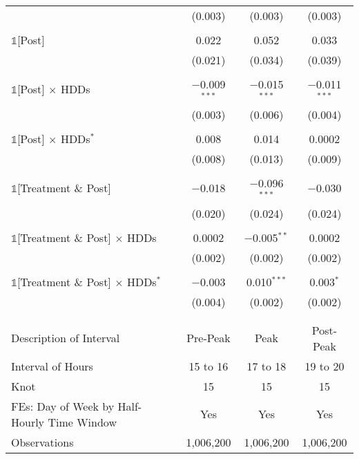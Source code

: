 {\begin{table}[t!]
\begin{adjustbox}{scale = 0.75}
\begin{threeparttable}
\begin{tabular}{@{\extracolsep{100pt}}lccc}
                    & (0.003) & (0.003) & (0.003) \\
                    & & & \\
                    $\mathbb{1}$[Post] & 0.022 & 0.052 & 0.033 \\
                    & (0.021) & (0.034) & (0.039) \\
                    & & & \\
                    $\mathbb{1}$[Post] $\times$ HDDs & $-$0.009$^{***}$ & $-$0.015$^{***}$ & $-$0.011$^{***}$ \\
                    & (0.003) & (0.006) & (0.004) \\
                    & & & \\
                    $\mathbb{1}$[Post] $\times$ HDDs$^{*}$ & 0.008 & 0.014 & 0.0002 \\
                    & (0.008) & (0.013) & (0.009) \\
                    & & & \\
                    $\mathbb{1}$[Treatment \& Post] & $-$0.018 & $-$0.096$^{***}$ & $-$0.030 \\
                    & (0.020) & (0.024) & (0.024) \\
                    & & & \\
                    $\mathbb{1}$[Treatment \& Post] $\times$ HDDs & 0.0002 & $-$0.005$^{**}$ & 0.0002 \\
                    & (0.002) & (0.002) & (0.002) \\
                    & & & \\
                    $\mathbb{1}$[Treatment \& Post] $\times$ HDDs$^{*}$ & $-$0.003 & 0.010$^{***}$ & 0.003$^{*}$ \\
                    & (0.004) & (0.002) & (0.002) \\
                    & & & \\
                    \hline
                    \\[-2.0ex]
                    Description of Interval & Pre-Peak & Peak & Post-Peak \\
                    Interval of Hours & 15 to 16 & 17 to 18 & 19 to 20 \\
                    Knot & 15 & 15 & 15 \\
                    FEs: Day of Week by Half-Hourly Time Window & Yes & Yes & Yes \\
                    Observations & 1,006,200 & 1,006,200 & 1,006,200 \\

\end{tabular}
\end{threeparttable}
\end{adjustbox}
\end{table}}
